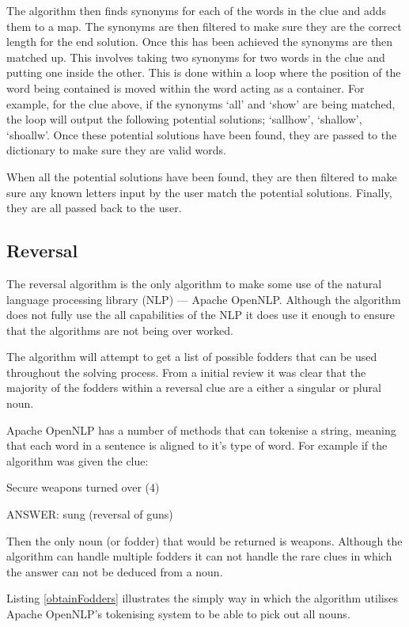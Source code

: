 The algorithm then finds synonyms for each of the words in the clue and adds
 them to a map. The synonyms are then filtered to make sure they are the 
correct length for the end solution. Once this has been achieved the synonyms
 are then matched up. This involves taking two synonyms for two words in the
 clue and putting one inside the other. This is done within a loop where the 
position of the word being contained is moved within the word acting as a 
container. For example, for the clue above, if the synonyms `all' and `show' 
are being matched, the loop will output the following potential solutions; 
`sallhow', `shallow', `shoallw'. Once these potential solutions have been 
found, they are passed to the dictionary to make sure they are valid words. 

When all the potential solutions have been found, they are then filtered to
 make sure any known letters input by the user match the potential solutions. 
Finally, they are all passed back to the user.
 

\subsection{Reversal}

The reversal algorithm is the only algorithm to make some use of the natural 
language processing library (NLP) --- Apache OpenNLP. Although the algorithm 
does not fully use the all capabilities of the NLP it does use it enough to 
ensure that the algorithms are not being over worked.

The algorithm will attempt to get a list of possible fodders that can be used 
throughout the solving process. From a initial review it was clear that the 
majority of the fodders within a reversal clue are a either a singular or plural
noun.

Apache OpenNLP has a number of methods that can tokenise a string, meaning that 
each word in a sentence is aligned to it's type of word. For example if the 
algorithm was given the clue:

Secure weapons turned over (4)

ANSWER: sung (reversal of guns)

Then the only noun (or fodder) that would be returned is weapons. Although the 
algorithm can handle multiple fodders it can not handle the rare clues in which
the answer can not be deduced from a noun.

Listing \ref{obtainFodders} illustrates the simply way in which the algorithm 
utilises Apache OpenNLP's tokenising system to be able to pick out all nouns.

